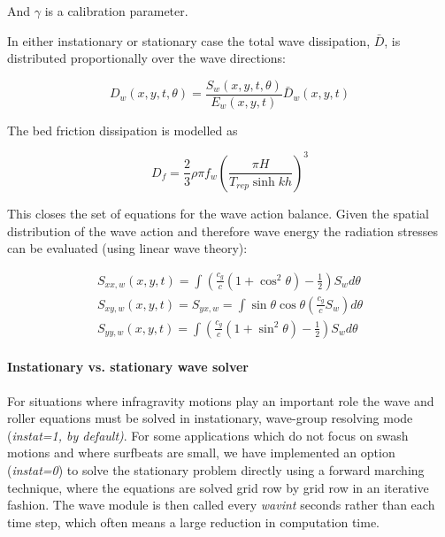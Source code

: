 And $\gamma$ is a calibration parameter. 

In either instationary or stationary case the total wave dissipation, $\bar{D}$, is distributed proportionally over the wave directions:

\begin{equation} \label{2.15)} 
D_{w} (x,y,t,\theta )=\frac{S_{w} (x,y,t,\theta )}{E_{w} (x,y,t)} \bar{D}_{w} (x,y,t) 
\end{equation} 

The bed friction dissipation is modelled as

\begin{equation} \label{2.16)} 
D_{f} =\frac{2}{3} \rho \pi f_{w} \left(\frac{\pi H}{T_{rep} \sinh kh} \right)^{3}  
\end{equation} 

This closes the set of equations for the wave action balance. Given the spatial distribution of the wave action and therefore wave energy the radiation stresses can be evaluated (using linear wave theory):

\begin{equation} \label{ZEqnNum727357} 
\begin{array}{l} {S_{xx,w} (x,y,t)=\int \left(\frac{c_{g} }{c} \left(1+\cos ^{2} \theta \right)-\frac{1}{2} \right)S_{w} d\theta  } \\ {S_{xy,w} (x,y,t)=S_{yx,w} =\int \sin \theta \cos \theta \left(\frac{c_{g} }{c} S_{w} \right) d\theta } \\ {S_{yy,w} (x,y,t)=\int \left(\frac{c_{g} }{c} \left(1+\sin ^{2} \theta \right)-\frac{1}{2} \right)S_{w} d\theta  } \end{array} 
\end{equation} 

\paragraph{Instationary vs. stationary wave solver}

For situations where infragravity motions play an important role the wave and roller equations must be solved in instationary, wave-group resolving mode (\textit{instat=1, by default)}. For some applications which do not focus on swash motions and where surfbeats are small, we have implemented an option (\textit{instat=0}) to solve the stationary problem directly using a forward marching technique, where the equations are solved grid row by grid row in an iterative fashion. The wave module is then called every \textit{wavint} seconds rather than each time step, which often means a large reduction in computation time. 

